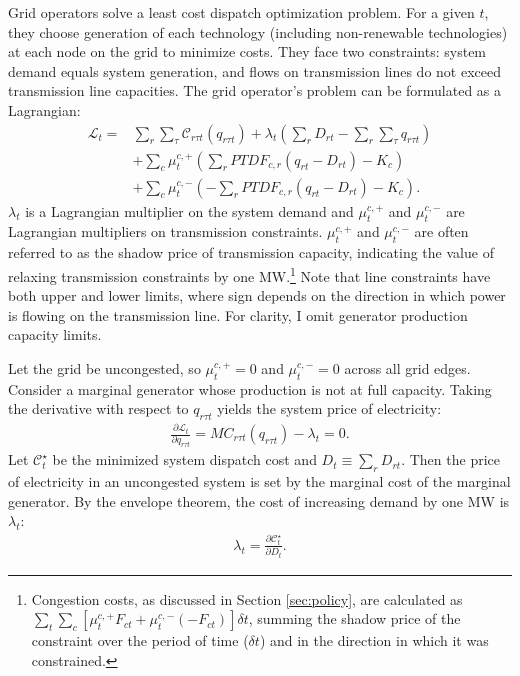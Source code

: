 \documentclass[12pt]{article}
\begin{document}
Grid operators solve a least cost dispatch optimization problem. For a given $t$, they choose generation of each technology (including non-renewable technologies) at each node on the grid to minimize costs. They face two constraints: system demand equals system generation, and flows on transmission lines do not exceed transmission line capacities. The grid operator's problem can be formulated as a Lagrangian:
\begin{equation}
\begin{aligned}
    \mathcal{L}_t
    ={}& \sum_r \sum_\tau \mathcal{C}_{r\tau t}(q_{r\tau t})
    + \lambda_t \left(\sum_r D_{rt}
        - \sum_r \sum_\tau q_{r\tau t}\right) \\
    &+ \sum_c \mu^{c,+}_t \left(\sum_r PTDF_{c,r}
        (q_{rt} - D_{rt}) - K_c\right) \\
    &+ \sum_c \mu^{c,-}_t \left(-\sum_r PTDF_{c,r}
        (q_{rt} - D_{rt}) - K_c\right).
\end{aligned}
\end{equation}
$\lambda_t$ is a Lagrangian multiplier on the system demand and $\mu^{c,+}_t$ and $\mu^{c,-}_t$ are Lagrangian multipliers on transmission constraints. $\mu^{c,+}_t$ and $\mu^{c,-}_t$ are often referred to as the shadow price of transmission capacity, indicating the value of relaxing transmission constraints by one MW.\footnote{Congestion costs, as discussed in Section \ref{sec:policy}, are calculated as $\sum_t\sum_c[\mu^{c,+}_t F_{ct}+\mu^{c,-}_t(-F_{ct})]\delta t$, summing the shadow price of the constraint over the period of time ($\delta t$) and in the direction in which it was constrained.} Note that line constraints have both upper and lower limits, where sign depends on the direction in which power is flowing on the transmission line. For clarity, I omit generator production capacity limits.

Let the grid be uncongested, so $\mu^{c,+}_t=0$ and $\mu^{c,-}_t=0$ across all grid edges. Consider a marginal generator whose production is not at full capacity. Taking the derivative with respect to $q_{r\tau t}$ yields the system price of electricity:
\begin{align}
    \frac{\partial \mathcal{L}_t}{\partial q_{r\tau t}} = MC_{r\tau t}(q_{r\tau t}) - \lambda_t = 0.
\end{align}
Let $\mathcal{C}^\star_t$ be the minimized system dispatch cost and $D_t \equiv \sum_r D_{rt}$. Then the price of electricity in an uncongested system is set by the marginal cost of the marginal generator. By the envelope theorem, the cost of increasing demand by one MW is $\lambda_t$:
\begin{align}
    \lambda_t = \frac{\partial \mathcal{C}_t^\star}{\partial D_t}.
\end{align}
\end{document}
